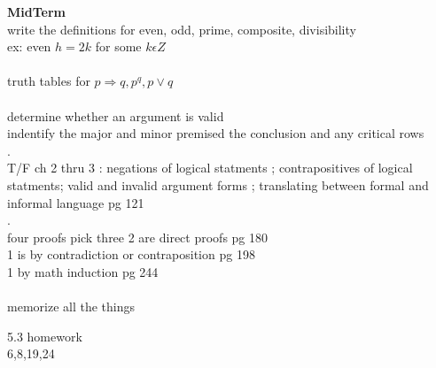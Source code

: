 \documentclass[10pt,letterpaper]{report}
\begin{document}
\par{\textbf{MidTerm }\\ write the definitions for even, odd, prime, composite, divisibility  \\ ex: even $ h = 2k $ for some $ k \epsilon Z $  \\ \\ truth tables for $ p \Rightarrow q , p ^ q , p \vee q $ \\ \\ determine whether an argument is valid \\ indentify the major and minor premised the conclusion and any critical rows \\ .\\ T/F ch 2 thru 3 : negations of logical statments ; contrapositives of logical statments; valid and invalid argument forms ; translating between formal and informal language pg 121 \\ .\\ four proofs pick three 2 are direct proofs pg 180  \\ 1 is by contradiction or contraposition pg 198 \\ 1 by math induction pg 244\\ \\ memorize all the things}
\linebreak
\par{5.3 homework \\ 6,8,19,24 }
\end{document}
